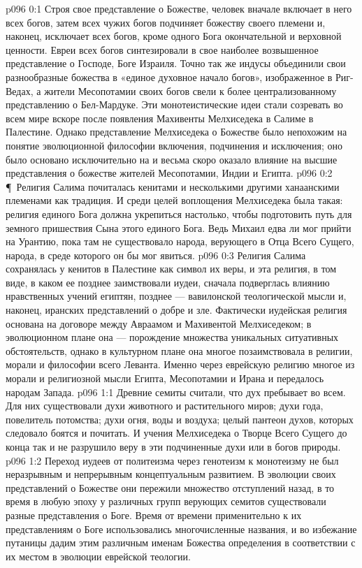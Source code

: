 \author{Мелхиседек}
\vs p096 0:1 Строя свое представление о Божестве, человек вначале включает в него всех богов, затем всех чужих богов подчиняет божеству своего племени и, наконец, исключает всех богов, кроме одного Бога окончательной и верховной ценности. Евреи всех богов синтезировали в свое наиболее возвышенное представление о Господе, Боге Израиля. Точно так же индусы объединили свои разнообразные божества в «единое духовное начало богов», изображенное в Риг\hyp{}Ведах, а жители Месопотамии своих богов свели к более централизованному представлению о Бел\hyp{}Мардуке. Эти монотеистические идеи стали созревать во всем мире вскоре после появления Махивенты Мелхиседека в Салиме в Палестине. Однако представление Мелхиседека о Божестве было непохожим на понятие эволюционной философии включения, подчинения и исключения; оно было основано исключительно на  и весьма скоро оказало влияние на высшие представления о божестве жителей Месопотамии, Индии и Египта.
\vs p096 0:2 \P\ Религия Салима почиталась кенитами и несколькими другими ханаанскими племенами как традиция. И среди целей воплощения Мелхиседека была такая: религия единого Бога должна укрепиться настолько, чтобы подготовить путь для земного пришествия Сына этого единого Бога. Ведь Михаил едва ли мог прийти на Урантию, пока там не существовало народа, верующего в Отца Всего Сущего, народа, в среде которого он бы мог явиться.
\vs p096 0:3 Религия Салима сохранялась у кенитов в Палестине как символ их веры, и эта религия, в том виде, в каком ее позднее заимствовали иудеи, сначала подверглась влиянию нравственных учений египтян, позднее --- вавилонской теологической мысли и, наконец, иранских представлений о добре и зле. Фактически иудейская религия основана на договоре между Авраамом и Махивентой Мелхиседеком; в эволюционном плане она --- порождение множества уникальных ситуативных обстоятельств, однако в культурном плане она многое позаимствовала в религии, морали и философии всего Леванта. Именно через еврейскую религию многое из морали и религиозной мысли Египта, Месопотамии и Ирана и передалось народам Запада.
\vs p096 1:1 Древние семиты считали, что дух пребывает во всем. Для них существовали духи животного и растительного миров; духи года, повелитель потомства; духи огня, воды и воздуха; целый пантеон духов, которых следовало боятся и почитать. И учения Мелхиседека о Творце Всего Сущего до конца так и не разрушило веру в эти подчиненные духи или в богов природы.
\vs p096 1:2 Переход иудеев от политеизма через генотеизм к монотеизму не был неразрывным и непрерывным концептуальным развитием. В эволюции своих представлений о Божестве они пережили множество отступлений назад, в то время в любую эпоху у различных групп верующих семитов существовали разные представления о Боге. Время от времени применительно к их представлениям о Боге использовались многочисленные названия, и во избежание путаницы дадим этим различным именам Божества определения в соответствии с их местом в эволюции еврейской теологии.
